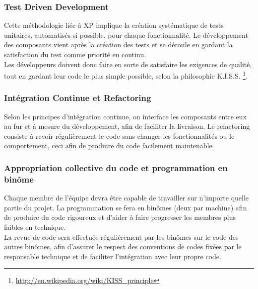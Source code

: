 \documentclass{../../res/univ-projet}
\begin{document}
\subsubsection{Test Driven Development}
	Cette méthodologie liée à XP implique la création systématique de tests unitaires, automatisés si possible, pour chaque fonctionnalité. Le développement des composants vient après la création des tests et se déroule en gardant la satisfaction du test comme priorité en continu.\\

	Les développeurs doivent donc faire en sorte de satisfaire les exigences de qualité, tout en gardant leur code le plus simple possible, selon la philosophie K.I.S.S. \footnote{\href{http://en.wikipedia.org/wiki/KISS\_principle}{http://en.wikipedia.org/wiki/KISS\_principle}}.
	 
\subsubsection{Intégration Continue et Refactoring}
	Selon les principes d'intégration continue, on interface les composants entre eux au fur et à mesure du développement, afin de faciliter la livraison. Le refactoring  consiste à revoir régulièrement le code sans changer les fonctionnalités ou le comportement, ceci afin de produire du code facilement maintenable.

\subsubsection{Appropriation collective du code et programmation en binôme}
	Chaque membre de l'équipe devra être capable de travailler sur n'importe quelle partie du projet. La programmation se fera en binômes (deux par machine) afin de produire du code rigoureux et d'aider à faire progresser les membres plus faibles en technique.\\

	La revue de code sera effectuée régulièrement par les binômes sur le code des autres binômes, afin d'assurer le respect des conventions de codes fixées par le responsable technique et de faciliter l'intégration avec leur propre code.
\end{document}
